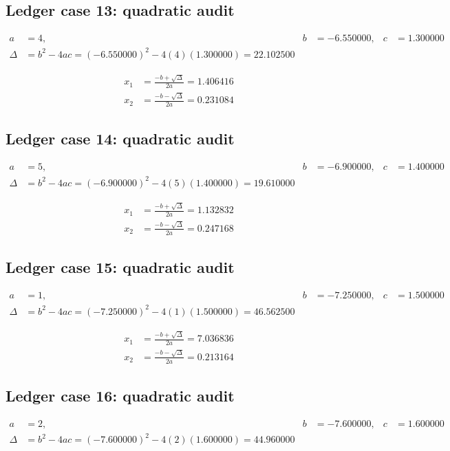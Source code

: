 \documentclass[11pt,a4paper]{article}
\begin{document}
\newpage

\subsection{Ledger case 13: quadratic audit}
\begin{align}
a &= 4, & b &= -6.550000, & c &= 1.300000 \\
\Delta &= b^2-4ac = (-6.550000)^2 - 4(4)(1.300000) = 22.102500
\end{align}

\begin{align}
x_1 &= \frac{-b+\sqrt{\Delta}}{2a} = 1.406416 \\
x_2 &= \frac{-b-\sqrt{\Delta}}{2a} = 0.231084
\end{align}

\subsection{Ledger case 14: quadratic audit}
\begin{align}
a &= 5, & b &= -6.900000, & c &= 1.400000 \\
\Delta &= b^2-4ac = (-6.900000)^2 - 4(5)(1.400000) = 19.610000
\end{align}

\begin{align}
x_1 &= \frac{-b+\sqrt{\Delta}}{2a} = 1.132832 \\
x_2 &= \frac{-b-\sqrt{\Delta}}{2a} = 0.247168
\end{align}

\subsection{Ledger case 15: quadratic audit}
\begin{align}
a &= 1, & b &= -7.250000, & c &= 1.500000 \\
\Delta &= b^2-4ac = (-7.250000)^2 - 4(1)(1.500000) = 46.562500
\end{align}

\begin{align}
x_1 &= \frac{-b+\sqrt{\Delta}}{2a} = 7.036836 \\
x_2 &= \frac{-b-\sqrt{\Delta}}{2a} = 0.213164
\end{align}

\newpage

\subsection{Ledger case 16: quadratic audit}
\begin{align}
a &= 2, & b &= -7.600000, & c &= 1.600000 \\
\Delta &= b^2-4ac = (-7.600000)^2 - 4(2)(1.600000) = 44.960000
\end{align}
\end{document}
